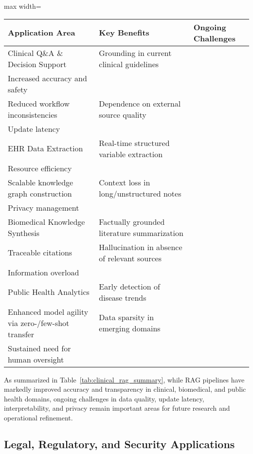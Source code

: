 \begin{table*}[htbp]
\centering
\caption{Summary of Key Benefits and Ongoing Challenges of RAG in Clinical Applications}
\label{tab:clinical_rag_summary}
\begin{adjustbox}{max width=\textwidth}
\begin{tabular}{lll}
\toprule
\textbf{Application Area} & \textbf{Key Benefits} & \textbf{Ongoing Challenges} \\
\midrule
Clinical Q\&A \& Decision Support & 
Grounding in current clinical guidelines\\
Increased accuracy and safety\\
Reduced workflow inconsistencies
& 
Dependence on external source quality\\
Update latency
\\
EHR Data Extraction & 
Real-time structured variable extraction\\
Resource efficiency\\
Scalable knowledge graph construction
& 
Context loss in long/unstructured notes\\
Privacy management
\\
Biomedical Knowledge Synthesis & 
Factually grounded literature summarization\\
Traceable citations
& 
Hallucination in absence of relevant sources\\
Information overload
\\
Public Health Analytics & 
Early detection of disease trends\\
Enhanced model agility via zero-/few-shot transfer
& 
Data sparsity in emerging domains\\
Sustained need for human oversight
\\
\bottomrule
\end{tabular}
\end{adjustbox}
\end{table*}

As summarized in Table~\ref{tab:clinical_rag_summary}, while RAG pipelines have markedly improved accuracy and transparency in clinical, biomedical, and public health domains, ongoing challenges in data quality, update latency, interpretability, and privacy remain important areas for future research and operational refinement.

\subsection{Legal, Regulatory, and Security Applications}

